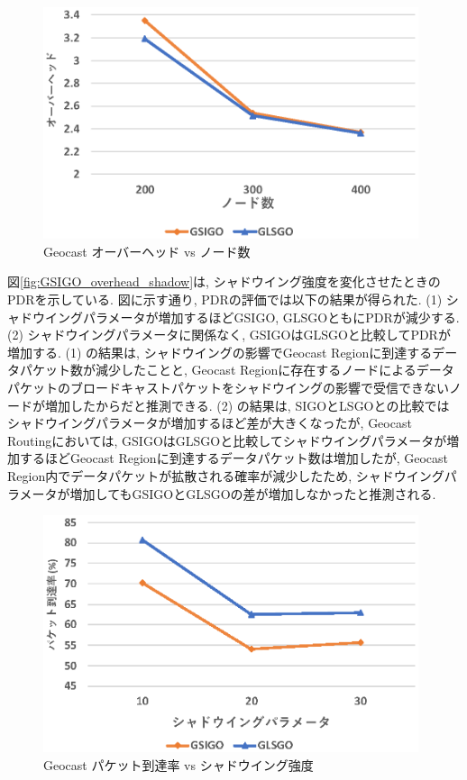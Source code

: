 \documentclass[10pt]{jreport}
\begin{document}
\begin{figure}[!ht]
	\centering
	\includegraphics[width=110mm]{figures/GSIGO_overhead_num.eps}
	\caption{Geocast オーバーヘッド vs ノード数}
	\label{fig:GSIGO_overhead_num}
\end{figure}

図\ref{fig:GSIGO_overhead_shadow}は, シャドウイング強度を変化させたときのPDRを示している.
図に示す通り, PDRの評価では以下の結果が得られた.
(1) シャドウイングパラメータが増加するほどGSIGO, GLSGOともにPDRが減少する.
(2) シャドウイングパラメータに関係なく, GSIGOはGLSGOと比較してPDRが増加する.
(1) の結果は, シャドウイングの影響でGeocast Regionに到達するデータパケット数が減少したことと, Geocast Regionに存在するノードによるデータパケットのブロードキャストパケットをシャドウイングの影響で受信できないノードが増加したからだと推測できる.
(2) の結果は, SIGOとLSGOとの比較ではシャドウイングパラメータが増加するほど差が大きくなったが, Geocast　Routingにおいては, GSIGOはGLSGOと比較してシャドウイングパラメータが増加するほどGeocast Regionに到達するデータパケット数は増加したが, Geocast　Region内でデータパケットが拡散される確率が減少したため, シャドウイングパラメータが増加してもGSIGOとGLSGOの差が増加しなかったと推測される. 

\begin{figure}[!ht]
	\centering
	\includegraphics[width=110mm]{figures/GSIGO_PDR_shadow.eps}
	\caption{Geocast パケット到達率 vs シャドウイング強度}
	\label{fig:GSIGO_PDR_shadow}
\end{figure}
\end{document}
